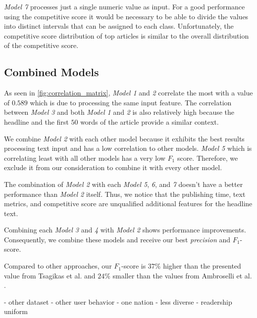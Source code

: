 \textit{Model 7} processes just a single numeric value as input. For a good performance using the competitive score it would be necessary to be able to divide the values into distinct intervals that can be assigned to each class.
Unfortunately, the competitive score distribution of top articles is similar to the overall distribution of the competitive score.



\subsection{Combined Models}
As seen in \autoref{fig:correlation_matrix}, \textit{Model 1} and \textit{2} correlate the most with a value of $0.589$ which is due to processing the same input feature.
The correlation between \textit{Model 3} and both \textit{Model 1} and \textit{2} is also relatively high because the headline and the first $50$ words of the article provide a similar context.

We combine \textit{Model 2} with each other model because it exhibits the best results processing text input and has a low correlation to other models.
\textit{Model 5} which is correlating least with all other models has a very low $F_1$ score. Therefore, we exclude it from our consideration to combine it with every other model.

The combination of \textit{Model 2} with each \textit{Model 5}, \textit{6}, and \textit{7} doesn't have a better performance than \textit{Model 2} itself. 
Thus, we notice that the publishing time, text metrics, and competitive score are unqualified additional features for the headline text.

Combining each \textit{Model 3} and \textit{4} with \textit{Model 2} shows performance improvements. Consequently, we combine these models and receive our best \textit{precision} and $F_1$-score.

Compared to other approaches, our $F_1$-score is $37\%$ higher than the presented value from Tsagikas et al. \cite{tsagkias2009predicting} and $24\%$ smaller than the values from Ambroselli et al. \cite{ambroselli2018prediction}. 

- other dataset
- other user behavior
	- one nation
	- less diverse
	- readership uniform


